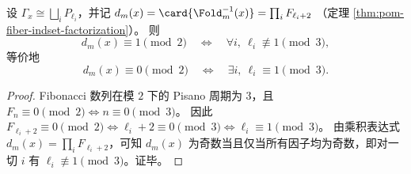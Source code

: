 \begin{corollary}\label{cor:pom-fiber-parity-mod3}
设 \(\Gamma_x\cong\bigsqcup_i P_{\ell_i}\)，并记
\(
d_m(x)=\card{\Fold_m^{-1}(x)}=\prod_i F_{\ell_i+2}
\)
（定理 \ref{thm:pom-fiber-indset-factorization}）。
则
\[
d_m(x)\equiv 1\pmod 2
\quad\Longleftrightarrow\quad
\forall i,\ \ell_i\not\equiv 1\pmod 3,
\]
等价地
\[
d_m(x)\equiv 0\pmod 2
\quad\Longleftrightarrow\quad
\exists i,\ \ell_i\equiv 1\pmod 3.
\]
\end{corollary}
\begin{proof}
Fibonacci 数列在模 \(2\) 下的 Pisano 周期为 \(3\)，且
\(
F_n\equiv 0\pmod 2\iff n\equiv 0\pmod 3
\)。
因此
\(
F_{\ell_i+2}\equiv 0\pmod 2\iff \ell_i+2\equiv 0\pmod 3\iff \ell_i\equiv 1\pmod 3
\)。
由乘积表达式 \(d_m(x)=\prod_i F_{\ell_i+2}\)，可知 \(d_m(x)\) 为奇数当且仅当所有因子均为奇数，即对一切 \(i\) 有 \(\ell_i\not\equiv 1\pmod 3\)。证毕。
\end{proof}




